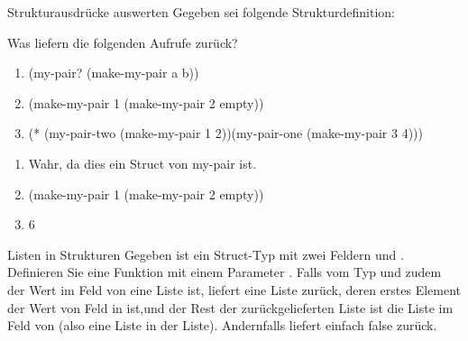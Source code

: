 \documentclass{../preamble}
\begin{document}
	\begin{task}[credit = \stars{1}{3}]{Strukturausdrücke auswerten}
	    Gegeben sei folgende Strukturdefinition:
	    
	    Was liefern die folgenden Aufrufe zurück?
	    \begin{enumerate}
	        \item (my-pair? (make-my-pair \grqq a\grqq{} \grqq b\grqq))
	        \item (make-my-pair 1 (make-my-pair 2 \textcolor{keywordcolor}{empty}))
	        \item (* (my-pair-two (make-my-pair 1 2))(my-pair-one (make-my-pair 3 4)))
	    \end{enumerate}
	
	    \begin{solution}
	        \begin{enumerate}
	            \item Wahr, da dies ein Struct von my-pair ist.
	            \item (make-my-pair 1 (make-my-pair 2 \textcolor{keywordcolor}{empty}))
	            \item 6
	        \end{enumerate}
	    \end{solution}
	\end{task}
	
	\begin{task}[credit = \stars{1}{3}]{Listen in Strukturen}
	    Gegeben ist ein Struct-Typ  mit zwei Feldern  und . Definieren Sie eine Funktion  mit einem Parameter . Falls  vom Typ  und zudem der Wert im Feld  von  eine Liste ist, liefert  eine Liste zurück, deren erstes Element der Wert von Feld  in  ist,und der Rest der zurückgelieferten Liste ist die Liste im Feld  von  (also eine Liste in der Liste). Andernfalls liefert  einfach \textcolor{keywordcolor}{false} zurück.
	
	    \begin{solution}
	        
	    \end{solution}
	\end{task}
	
	\clearpage
	
\end{document}
